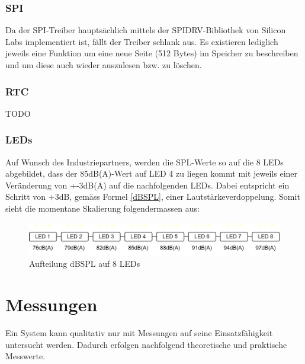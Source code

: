 \documentclass[12pt]{article}
\begin{document}
	\subsubsection*{SPI}
	Da der SPI-Treiber hauptsächlich mittels der SPIDRV-Bibliothek von Silicon Labs implementiert ist, fällt der Treiber schlank aus. Es existieren lediglich jeweils eine Funktion um eine neue Seite (512 Bytes) im Speicher zu beschreiben und um diese auch wieder auszulesen bzw. zu löschen.
	\subsubsection*{RTC}
	\color{red}TODO\color{black}
	\subsubsection*{LEDs}
	Auf Wunsch des Industriepartners, werden die SPL-Werte so auf die 8 LEDs abgebildet, dass der 85dB(A)-Wert auf LED 4 zu liegen kommt mit jeweils einer Veränderung von +-3dB(A) auf die nachfolgenden LEDs. Dabei entspricht ein Schritt von +3dB, gemäss Formel \ref{dBSPL}, einer Lautstärkeverdoppelung. Somit sieht die momentane Skalierung folgendermassen aus:
	\begin{figure}[H]
		\centering
		\includegraphics[width=1\linewidth]{images/BAT_Skalierung-SPL-auf-LED}
		\caption{Aufteilung dBSPL auf 8 LEDs}
		\label{fig:batskalierung-spl-auf-led}
	\end{figure}
	
	
	\newpage
	\section{Messungen}\label{Messungen}
	Ein System kann qualitativ nur mit Messungen auf seine Einsatzfähigkeit untersucht werden. Dadurch erfolgen nachfolgend theoretische und praktische Messwerte.
\end{document}
